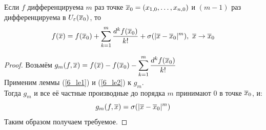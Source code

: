 \begin{theorem}
	Если $f$ дифференцируема $m$ раз точке $\overline x_0=(x_{1,0},\dots,x_{n,0})$ и $(m-1)$ раз дифференцируема в $U_\varepsilon(\overline x_0)$, то 
	\[f(\vx)=f(\vx_0)+\sum_{k=1}^m\frac{d^kf(\vx_0)}{k!}+\sigma(|\vx-\vx_0|^m),\ \vx\ra\vx_0\]
\end{theorem}
\begin{proof}
	Возьмём $\displaystyle g_m(f,\vx)=f(\vx)-f(\vx_0)-\sum_{k=1}^m\frac{d^kf(\vx_0)}{k!}$\\
	Применим леммы (\ref{6_le1}) и (\ref{6_le2}) к $g_m$.\\
	Тогда $g_m$ и все её частные производные до порядка $m$ принимают $0$ в точке $\overline x_0$, и:
	\[g_m(f,\overline x)=\sigma(|\overline x-\overline x_0|^m)\]
	Таким образом получаем требуемое.
\end{proof}